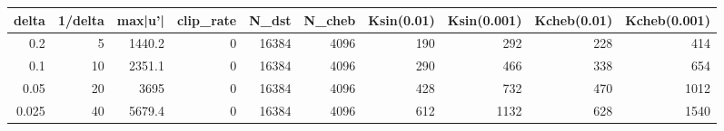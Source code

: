 \begin{tabular}{rrrrrrrrrr}
\toprule
delta & 1/delta & max|u'| & clip_rate & N_dst & N_cheb & Ksin(0.01) & Ksin(0.001) & Kcheb(0.01) & Kcheb(0.001) \\
\midrule
0.2 & 5 & 1440.2 & 0 & 16384 & 4096 & 190 & 292 & 228 & 414 \\
0.1 & 10 & 2351.1 & 0 & 16384 & 4096 & 290 & 466 & 338 & 654 \\
0.05 & 20 & 3695 & 0 & 16384 & 4096 & 428 & 732 & 470 & 1012 \\
0.025 & 40 & 5679.4 & 0 & 16384 & 4096 & 612 & 1132 & 628 & 1540 \\
\bottomrule
\end{tabular}